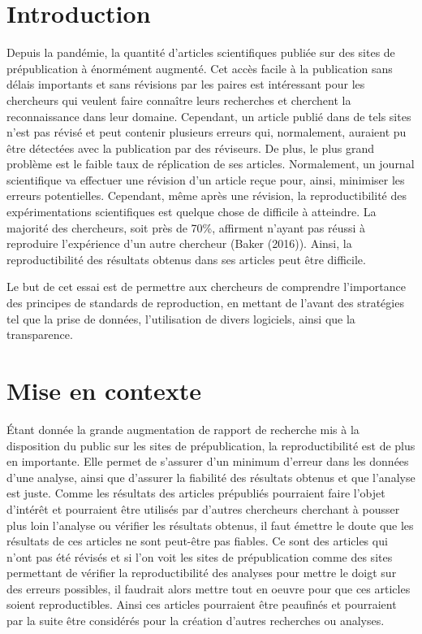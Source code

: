 \documentclass[
]{article}
\author{true}
\date{}
\begin{document}
\hypertarget{introduction}{%
\section{Introduction}\label{introduction}}

Depuis la pandémie, la quantité d'articles scientifiques publiée sur des
sites de prépublication à énormément augmenté. Cet accès facile à la
publication sans délais importants et sans révisions par les paires est
intéressant pour les chercheurs qui veulent faire connaître leurs
recherches et cherchent la reconnaissance dans leur domaine. Cependant,
un article publié dans de tels sites n'est pas révisé et peut contenir
plusieurs erreurs qui, normalement, auraient pu être détectées avec la
publication par des réviseurs. De plus, le plus grand problème est le
faible taux de réplication de ses articles. Normalement, un journal
scientifique va effectuer une révision d'un article reçue pour, ainsi,
minimiser les erreurs potentielles. Cependant, même après une révision,
la reproductibilité des expérimentations scientifiques est quelque chose
de difficile à atteindre. La majorité des chercheurs, soit près de 70\%,
affirment n'ayant pas réussi à reproduire l'expérience d'un autre
chercheur (Baker (2016)). Ainsi, la reproductibilité des résultats
obtenus dans ses articles peut être difficile.

Le but de cet essai est de permettre aux chercheurs de comprendre
l'importance des principes de standards de reproduction, en mettant de
l'avant des stratégies tel que la prise de données, l'utilisation de
divers logiciels, ainsi que la transparence.

\hypertarget{mise-en-contexte}{%
\section{Mise en contexte}\label{mise-en-contexte}}

Étant donnée la grande augmentation de rapport de recherche mis à la
disposition du public sur les sites de prépublication, la
reproductibilité est de plus en importante. Elle permet de s'assurer
d'un minimum d'erreur dans les données d'une analyse, ainsi que
d'assurer la fiabilité des résultats obtenus et que l'analyse est juste.
Comme les résultats des articles prépubliés pourraient faire l'objet
d'intérêt et pourraient être utilisés par d'autres chercheurs cherchant
à pousser plus loin l'analyse ou vérifier les résultats obtenus, il faut
émettre le doute que les résultats de ces articles ne sont peut-être pas
fiables. Ce sont des articles qui n'ont pas été révisés et si l'on voit
les sites de prépublication comme des sites permettant de vérifier la
reproductibilité des analyses pour mettre le doigt sur des erreurs
possibles, il faudrait alors mettre tout en oeuvre pour que ces articles
soient reproductibles. Ainsi ces articles pourraient être peaufinés et
pourraient par la suite être considérés pour la création d'autres
recherches ou analyses.
\end{document}
